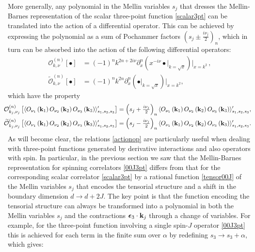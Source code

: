 \documentclass[11pt,a4paper]{article}
\newcommand{\pl}{{\partial}}
\begin{document}
More generally, any polynomial in the Mellin variables $s_j$ that dresses the Mellin-Barnes representation of the scalar three-point function \eqref{scalar3pt} can be translated into the action of a differential operator. This can be achieved by expressing the polynomial as a sum of Pochammer factors $\left(s_j\pm\tfrac{i\nu_j}{2}\right)_n$, which in turn can be absorbed into the action of the following differential operators:
\begin{subequations}\label{PochhOp}
\begin{align}
    \mathcal{O}_{k,\nu}^{(n)}[\bullet]&=(-1)^n k^{2n+2i\nu}\pl_{x}^n\left(x^{-i\nu}\bullet\Big|_{k=\sqrt{x}}\right)\Big|_{x=k^2}\,,\\
    \widetilde{\mathcal{O}}_{k,\nu}^{(n)}[\bullet]&=(-1)^n k^{2n}\pl_{x}^n\left(\bullet\Big|_{k=\sqrt{x}}\right)\Big|_{x=k^2},
\end{align}
\end{subequations}
which have the property
\begin{subequations}\label{actionop}
\begin{align}
  \hspace*{-0.25cm}  \mathcal{O}_{k_j,\nu_j}^{(n)}\left[\langle O_{\nu_1}\left({\bf k}_1\right)O_{\nu_2}\left({\bf k}_2\right)O_{\nu_3}\left({\bf k}_3\right)  \rangle^\prime_{s_1,s_2,s_3}\right]&=\left(s_j+\tfrac{i\nu_j}{2}\right)_n\langle O_{\nu_1}\left({\bf k}_1\right)O_{\nu_2}\left({\bf k}_2\right)O_{\nu_3}\left({\bf k}_3\right)  \rangle^\prime_{s_1,s_2,s_3},\\
   \hspace*{-0.25cm}  \widetilde{\mathcal{O}}_{k_j,\nu_j}^{(n)}\left[\langle O_{\nu_1}\left({\bf k}_1\right)O_{\nu_2}\left({\bf k}_2\right)O_{\nu_3}\left({\bf k}_3\right)  \rangle^\prime_{s_1,s_2,s_3}\right]&=\left(s_j-\tfrac{i\nu_j}{2}\right)_n
   \langle O_{\nu_1}\left({\bf k}_1\right)O_{\nu_2}\left({\bf k}_2\right)O_{\nu_3}\left({\bf k}_3\right)  \rangle^\prime_{s_1,s_2,s_3}.
\end{align}
\end{subequations}
As will become clear, the relations \eqref{actionop} are particularly useful when dealing with three-point functions generated by derivative interactions and also operators with spin. In particular, in the previous section we saw that the Mellin-Barnes representation for spinning correlators \eqref{00J3pt} differs from that for the corresponding scalar correlator \eqref{scalar3pt} by a rational function \eqref{tensor00J} of the Mellin variables $s_j$ that encodes the tensorial structure and a shift in the boundary dimension $d \to d + 2J$. The key point is that the function encoding the tensorial structure can always be transformed into a polynomial in both the Mellin variables $s_j$ and the contractions $\boldsymbol{\epsilon}_3 \cdot {\bf k}_j$ through a change of variables. For example, for the three-point function involving a single spin-$J$ operator \eqref{00J3pt} this is achieved for each term in the finite sum over $\alpha$ by redefining $s_3 \to s_3 + \alpha$, which gives: 
\end{document}
